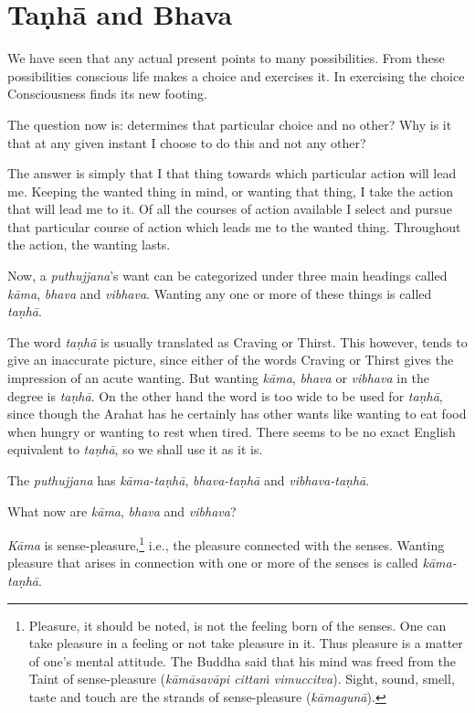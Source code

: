 \chapter{Taṇhā and Bhava}

We have seen that any actual present points to many possibilities. From these possibilities conscious life makes a choice and exercises it. In exercising the choice Consciousness finds its new footing.

The question now is:  determines that particular choice and no other? Why is it that at any given instant I choose to do this and not any other?

The answer is simply that I  that thing towards which  particular action will lead me. Keeping the wanted thing in mind, or wanting that thing, I take the action that will lead me to it. Of all the courses of action available I select and pursue that particular course of action which leads me to the wanted thing. Throughout the action, the wanting lasts.

Now, a \emph{puthujjana}'s want can be categorized under three main headings called \emph{kāma}, \emph{bhava} and \emph{vibhava}. Wanting any one or more of these things is called \emph{taṇhā}.

The word \emph{taṇhā} is usually translated as Craving or Thirst. This however, tends to give an inaccurate picture, since either of the words Craving or Thirst gives the impression of an acute wanting. But wanting \emph{kāma}, \emph{bhava} or \emph{vibhava} in the  degree is \emph{taṇhā}. On the other hand the word  is too wide to be used for \emph{taṇhā}, since though the Arahat has  he certainly has other wants like wanting to eat food when hungry or wanting to rest when tired. There seems to be no exact English equivalent to \emph{taṇhā}, so we shall use it as it is.

The \emph{puthujjana} has \emph{kāma-taṇhā}, \emph{bhava-taṇhā} and \emph{vibhava-taṇhā}.

What now are \emph{kāma}, \emph{bhava} and \emph{vibhava}?

\emph{Kāma} is sense-pleasure,\footnote{Pleasure, it should be noted, is not the feeling born of the senses. One can take pleasure in a feeling or not take pleasure in it. Thus pleasure is a matter of one's mental attitude. The Buddha said that his mind was freed from the Taint of sense-pleasure (\emph{kāmāsavāpi cittaṁ vimuccitva}). Sight, sound, smell, taste and touch are the strands of sense-pleasure (\emph{kāmagunā}).} i.e., the pleasure connected with the senses. Wanting pleasure that arises in connection with one or more of the senses is called \emph{kāma-taṇhā}.

